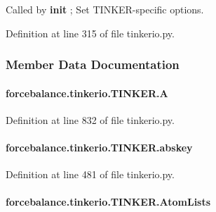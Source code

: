 Called by {\bfseries init} ; Set T\-I\-N\-K\-E\-R-\/specific options. 



Definition at line 315 of file tinkerio.\-py.



\subsubsection{Member Data Documentation}
\hypertarget{classforcebalance_1_1tinkerio_1_1TINKER_abffae1bbf80b2ef21aedb60fe2be2bbe}{
\paragraph[{A}]{\setlength{\rightskip}{0pt plus 5cm}forcebalance.\-tinkerio.\-T\-I\-N\-K\-E\-R.\-A}}\label{classforcebalance_1_1tinkerio_1_1TINKER_abffae1bbf80b2ef21aedb60fe2be2bbe}


Definition at line 832 of file tinkerio.\-py.

\hypertarget{classforcebalance_1_1tinkerio_1_1TINKER_ada313a70357c2d3a1b240f6d6ef41a4d}{
\paragraph[{abskey}]{\setlength{\rightskip}{0pt plus 5cm}forcebalance.\-tinkerio.\-T\-I\-N\-K\-E\-R.\-abskey}}\label{classforcebalance_1_1tinkerio_1_1TINKER_ada313a70357c2d3a1b240f6d6ef41a4d}


Definition at line 481 of file tinkerio.\-py.

\hypertarget{classforcebalance_1_1tinkerio_1_1TINKER_a7cc6fc75f1b433c724d4be094109b2e6}{
\paragraph[{Atom\-Lists}]{\setlength{\rightskip}{0pt plus 5cm}forcebalance.\-tinkerio.\-T\-I\-N\-K\-E\-R.\-Atom\-Lists}}\label{classforcebalance_1_1tinkerio_1_1TINKER_a7cc6fc75f1b433c724d4be094109b2e6}


